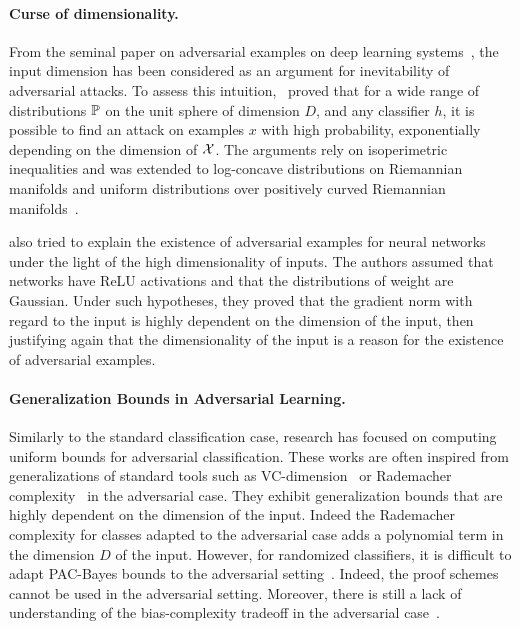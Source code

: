 \paragraph{Curse of dimensionality.} From the seminal paper on adversarial examples on deep learning systems~\citep{Szegedy2013IntriguingPO}, the input dimension has been considered as an argument for inevitability of adversarial attacks. To assess this intuition,~\citet{gilmer2018adversarial,shafahi2018adversarial} proved that for a wide range of distributions $\mathbb{P}$ on the unit sphere of dimension $D$, and any classifier $h$, it is possible to find an attack on examples $x$ with high probability, exponentially depending on the dimension of $\mathcal{X}$. The arguments rely on isoperimetric inequalities and was extended to log-concave distributions on Riemannian manifolds and uniform distributions over positively curved Riemannian manifolds~\citep{pmlr-v97-dohmatob19a}. 

\cite{simon2019first} also tried to explain the existence of adversarial examples for neural networks under the light of the high dimensionality of inputs. The authors assumed that networks have ReLU activations and that the distributions of weight are Gaussian. Under such hypotheses, they proved that the gradient norm with regard to the input is highly dependent on the dimension of the input, then justifying again that the dimensionality of the input is a reason for the existence of adversarial examples. 




\paragraph{Generalization Bounds in Adversarial Learning.} Similarly to the standard classification case, research has focused on computing uniform bounds for adversarial classification. These works are often inspired from generalizations of standard tools such as VC-dimension~\citep{cullina2018pac} or Rademacher complexity~\citep{yin2019rademacher,khim2018adversarial,awasthi2020adversarial} in the adversarial case. They exhibit generalization bounds that are highly dependent on the dimension of the input. Indeed the Rademacher complexity for classes adapted to the adversarial case adds a polynomial term in the dimension $D$ of the input. However, for randomized classifiers, it is difficult to adapt PAC-Bayes bounds to the adversarial setting~\citep{viallard2021pac}. Indeed, the proof schemes cannot be used in the adversarial setting. Moreover, there is still a lack of understanding of the bias-complexity tradeoff in the adversarial case~\citep{wang2018analyzing}. 

